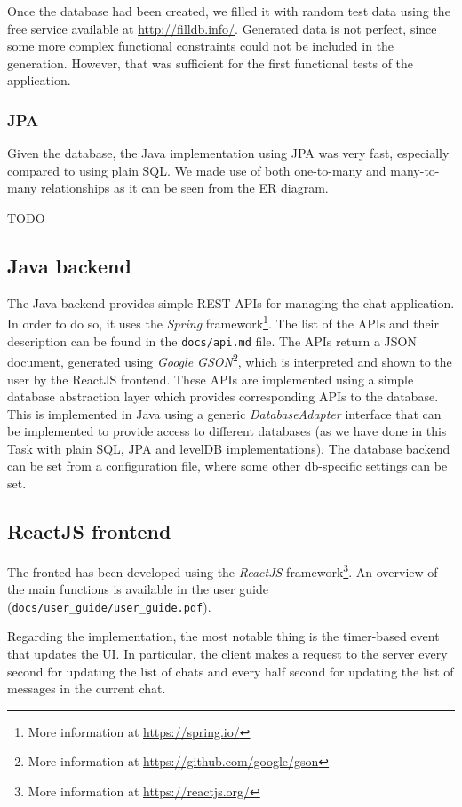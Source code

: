 \documentclass[10pt]{article}
\begin{document}
Once the database had been created, we filled it with random test data using the free
service available at \url{http://filldb.info/}. Generated data is not perfect, 
since some more complex functional constraints could not be included in the 
generation. However, that was sufficient for the first functional tests of the
application.

\subsubsection{JPA}
Given the database, the Java implementation using JPA was very fast, especially
compared to using plain SQL. We made use of both one-to-many and many-to-many 
relationships as it can be seen from the ER diagram.

TODO

\subsection{Java backend}
The Java backend provides simple REST APIs for managing the chat application. 
In order to do so, it uses the \emph{Spring} framework\footnote{More information
at \url{https://spring.io/}}.
The list of the APIs and their description can be found in the 
\texttt{docs/api.md} file. The APIs return a JSON document, generated using
\emph{Google GSON}\footnote{More information at 
\url{https://github.com/google/gson}}, which is interpreted and shown to the user
by the ReactJS frontend.
These APIs are implemented using a simple database abstraction layer which provides 
corresponding APIs to the database. This is implemented in Java 
using a generic \emph{DatabaseAdapter} interface that can be implemented to 
provide access to different databases (as we have done in this Task with plain SQL, 
JPA and levelDB implementations). The database backend can be set from a configuration
file, where some other db-specific settings can be set.

\subsection{ReactJS frontend}
The fronted has been developed using the \emph{ReactJS} framework\footnote{More
information at \url{https://reactjs.org/}}. An overview of the main functions 
is available in the user guide (\texttt{docs/user\_guide/user\_guide.pdf}).

Regarding the implementation, the most notable thing is the timer-based event
that updates the UI. In particular, the client makes a request to the server
every second for updating the list of chats and every half second for updating 
the list of messages in the current chat.
\end{document}
